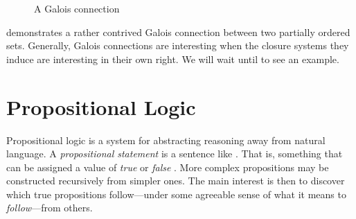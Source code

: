 \begin{figure}[H]
  \caption{A Galois connection}
  \label{figure:Galois-connection}
\end{figure}

 demonstrates a rather contrived Galois connection between two partially ordered sets. Generally, Galois
connections are interesting when the closure systems they induce are interesting in their own right. We will wait until 
to see an example.

\section{Propositional Logic}
\label{section:propositional-logic}

Propositional logic is a system for abstracting reasoning away from natural language. A \textit{propositional statement} is a sentence like
. That is, something that can be assigned a value of \textit{true} or \textit{false} \cite[p. 7]{Ben1993Mathematical}.
More complex propositions may be constructed recursively from simpler ones. The main interest is then to discover which true propositions follow---under
some agreeable sense of what it means to \textit{follow}---from others.


